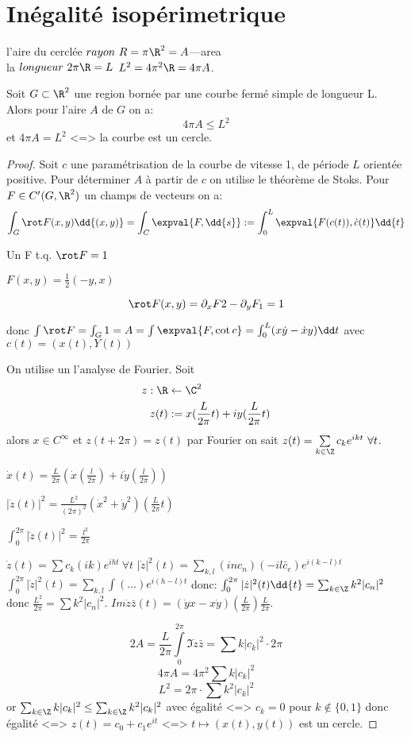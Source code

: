 				\section{Inégalité isopérimetrique} %

				l'aire du cerclée  $rayon\ R=\pi\R^2=A$---area\\
				la $longueur\ 2\pi\R=L$
				$L^2=4\pi^2\R=4\pi A$.
				\begin{theorem}
					Soit $G\subset\R^2$ une region bornée par une courbe fermé simple de longueur L. Alors pour l'aire $A$ de $G$ on a:
					$$4\pi A\leq L^2$$
					et $4\pi A=L^2$ <=> la courbe est un cercle.
				\end{theorem}
				\begin{proof}
					Soit $c$ une paramétrisation de la courbe de vitesse 1, de période $L$ orientée positive. Pour déterminer $A$ à partir de $c$ on utilise le théorème de Stoks. Pour $F\in C'(G,\R^2)$ un champs de vecteurs on a:
					$$\int_G \rot F(x,y)\dd{(x,y)}=\int_C \expval{F,\dd{s}}:=\int_0^L \expval{F(c(t)),\dot c(t)}\dd{t}$$
		
					Un F t.q. $\rot F=1$
		
					$F(x,y)=\frac 12 (-y,x)$
		
					$$\rot F(x,y)=\partial_x F2 - \partial_y F_1 = 1$$
		
					donc $\int \rot F=\int_G 1=A=\int\expval{F, \cot c}=\int_0^L(x\dot y-\dot x y)\dd t$ avec $c(t)=(x(t),Y(t))$
		
					On utilise un l'analyse de Fourier. Soit 
					\begin{align*}			
						z:\R &\leftarrow  \C^2\\
						z(t) &:= x(\frac L{2\pi}t)+i y(\frac L{2\pi}t)
					\end{align*}
					alors $x\in C^\infty$ et $z(t+2\pi)=z(t)$ par Fourier on sait $z(t)=\sum\limits_{k\in\Z}c_ke^{ikt}\ \forall t$.
		
					$\dot x(t)=\frac L{2\pi}(\dot x(\frac l{2\pi})+i\dot y(\frac l{2\pi}))$
		
					$|\dot z(t)|^2=\frac{L^2}{(2\pi)^2}(\dot x^2+\dot y^2)(\frac L{2\pi}t)$
		
					$\int_0^{2\pi}|\dot z (t)|^2=\frac{l^2}{2\pi}$
		
					$\dot z(t)=\sum c_k(ik)e^{iht}\ \forall t$
					$|\dot z|^2(t)=\sum_{k,l}(inc_n)(-il\bar c_e)e^{i(k-l)t}$
					$\int_0^{2\pi}|\dot z|^2(t)=\sum_{k,l}\int(...)e^{i(h-l)t}$
					donc:
					$\int_0^{2\pi}|\dot z|^2(t)\dd{t}=\sum_{k\in\Z}k^2|c_n|^2$ donc $\frac{L^2}{2\pi}=\sum k^2|c_n|^2$.
					$Im\dot z\bar z(t)=(\dot yx-x\dot y)(\frac L{2\pi})\frac L{2\pi}$.
		
					$$2A=\frac L{2\pi}\int\limits_0^{2\pi}\Im \dot z\bar z=\sum k|c_k|^2\cdot 2\pi$$
					$$4\pi A=4\pi^2\sum k|c_k|^2$$
					$$L^2=2\pi\cdot \sum k^2 |c_k|^2$$
					or $\sum_{k\in\Z}k|c_k|^2\leq\sum_{k\in\Z}k^2|c_k|^2$ avec égalité <=> $c_k=0$ pour $k\not\in\{0,1\}$ donc égalité <=> $z(t)=c_0+c_1e^{it}$ <=> $t\mapsto (x(t),y(t))$ est un cercle.
		
				\end{proof}